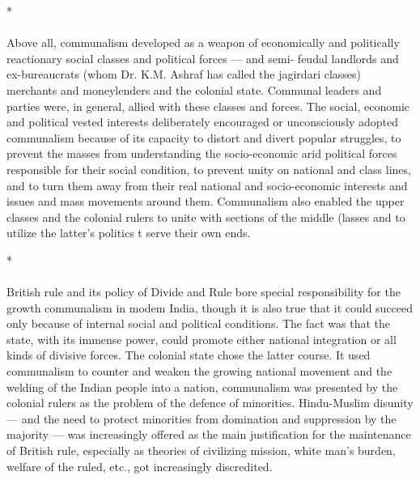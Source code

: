 \begin{center}*\end{center}

\paragraph*{}


Above all, communalism developed as a weapon of economically and politically reactionary social classes and political forces --- and semi- feudal landlords and ex-bureaucrats (whom Dr. K.M. Ashraf has called the jagirdari classes) merchants and moneylenders and the colonial state. Communal leaders and parties were, in general, allied with these classes and forces. The social, economic and political vested interests deliberately encouraged or unconsciously adopted communalism because of its capacity to distort and divert popular struggles, to prevent the masses from understanding the socio-economic arid political forces responsible for their social condition, to prevent unity on national and class lines, and to turn them away from their real national and socio-economic interests and issues and mass movements around them. Communalism also enabled the upper classes and the colonial rulers to unite with sections of the middle (lasses and to utilize the latter's politics t serve their own ends.

\begin{center}*\end{center}

\paragraph*{}


British rule and its policy of Divide and Rule bore special responsibility for the growth communalism in modem India, though it is also true that it could succeed only because of internal social and political conditions. The fact was that the state, with its immense power, could promote either national integration or all kinds of divisive forces. The colonial state chose the latter course. It used communalism to counter and weaken the growing national movement and the welding of the Indian people into a nation, communalism was presented by the colonial rulers as the problem of the defence of minorities. Hindu-Muslim disunity --- and the need to protect minorities from domination and suppression by the majority --- was increasingly offered as the main justification for the maintenance of British rule, especially as theories of civilizing mission, white man's burden, welfare of the ruled, etc., got increasingly discredited. 

